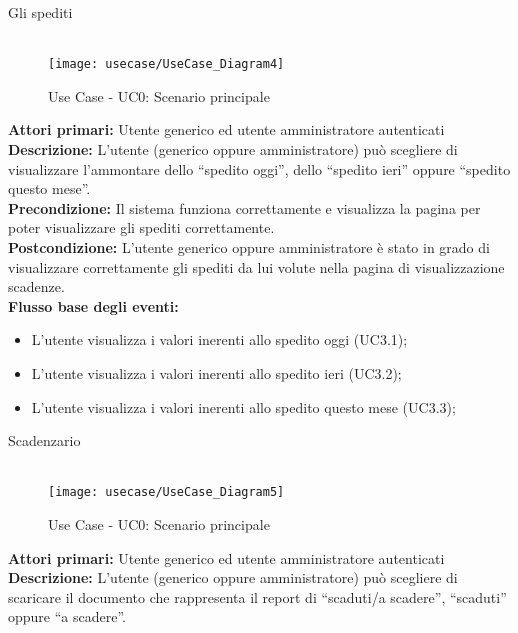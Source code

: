 Gli spediti \\\\

\begin{figure}[!h] 
    \centering 
    \texttt{[image: usecase/UseCase\_Diagram4]} 
    \caption{Use Case - UC0: Scenario principale}
\end{figure} 

\textbf{Attori primari:} Utente generico ed utente amministratore autenticati
\\


\textbf{Descrizione:}  L’utente (generico oppure amministratore) può scegliere di visualizzare l’ammontare dello “spedito oggi”, dello “spedito ieri” oppure “spedito questo mese”.  \\

\textbf{Precondizione:} Il sistema funziona correttamente e visualizza la pagina per poter visualizzare gli spediti correttamente. \\

\textbf{Postcondizione:} L’utente generico oppure amministratore è stato in grado di visualizzare correttamente gli spediti da lui volute nella pagina di visualizzazione scadenze.  \\


\textbf{Flusso base degli eventi:} 

\begin{itemize}

\item L’utente visualizza i valori inerenti allo spedito oggi (UC3.1);
\item L’utente visualizza i valori inerenti allo spedito ieri (UC3.2);
\item L’utente visualizza i valori inerenti allo spedito questo mese (UC3.3);

\end{itemize}


Scadenzario \\\\

\begin{figure}[!h] 
    \centering 
    \texttt{[image: usecase/UseCase\_Diagram5]} 
    \caption{Use Case - UC0: Scenario principale}
\end{figure} 

\textbf{Attori primari:} Utente generico ed utente amministratore autenticati
\\


\textbf{Descrizione:}   L’utente (generico oppure amministratore) può scegliere di scaricare il documento che rappresenta il report di “scaduti/a scadere”, “scaduti” oppure “a scadere”.   \\

